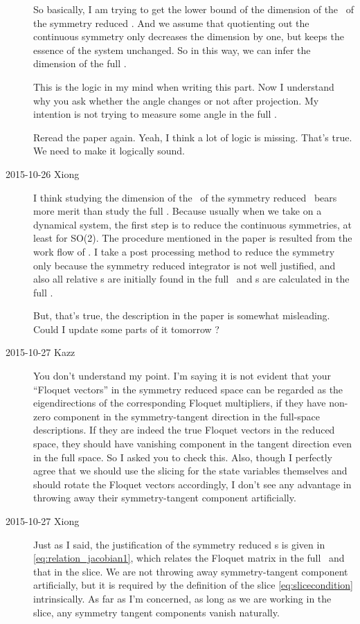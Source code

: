 \begin{description}
So basically, I am trying to get the lower bound of the dimension
of the \inm\ of the symmetry reduced \statesp. And we assume that
quotienting out the continuous symmetry only decreases the dimension
by one, but keeps the essence of the system unchanged. So in this way,
we can infer the dimension of the full \statesp.

This is the logic in my mind when writing this part.
Now I understand
why you ask whether the angle changes or not after projection.
My intention is not trying to measure some angle in the full \statesp.

Reread the paper again. Yeah, I think a lot of logic is missing.
That's true. We need to make it logically sound.


\item[2015-10-26 Xiong]
I think studying the dimension of the \inm\ of the symmetry reduced
\statesp\ bears more merit than study the full \statesp.
Because usually when we take on a dynamical system, the first step
is to reduce the continuous symmetries, at least for SO(2).
The procedure mentioned in the paper is resulted from the work flow
of \KSe. I take a post processing method to reduce the symmetry only
because the symmetry reduced integrator is not well
justified, and also all relative \po s are initially found in the
full \statesp\ and \Fv s are calculated in the full \statesp.

But, that's true, the description in the paper is somewhat misleading.
Could I update some parts of it tomorrow ?

\item[2015-10-27 Kazz]
You don't understand my point. I'm saying it is not evident that your ``Floquet vectors'' in the symmetry reduced space can be regarded as the eigendirections of the corresponding Floquet multipliers, if they have non-zero component in the symmetry-tangent direction in the full-space descriptions. If they are indeed the true Floquet vectors in the reduced space, they should have vanishing component in the tangent direction even in the full space. So I asked you to check this. Also, though I perfectly agree that we should use the slicing for the state variables themselves and should rotate the Floquet vectors accordingly, I don't see any advantage in throwing away their symmetry-tangent component artificially.

\item[2015-10-27 Xiong]
Just as I said, the justification of the symmetry reduced
\Fv s is given in \eqref{eq:relation_jacobian1}, which relates the
Floquet matrix in the full \statesp\ and that in the slice. We are not
throwing away symmetry-tangent component artificially, but it is
required by the definition of the slice
\eqref{eq:slicecondition} intrinsically. As far as I'm concerned,
as long as we are working in the slice, any symmetry tangent
components vanish naturally.


\end{description}
